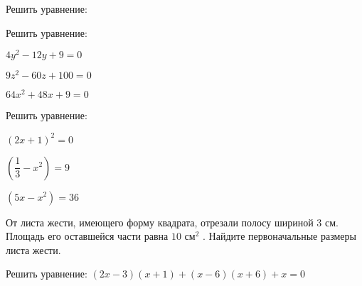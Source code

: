 %
%
\begin{homework}[number=1]
	\begin{listofex}
		\item Решить уравнение:
		\begin{enumcols}[itemcolumns=3]
			\item {}
			\item {}
			\item {}
			\item {}
			\item {}
			\item {}
		\end{enumcols}
		\item {}
		\item Решить уравнение:
			\begin{enumcols}[itemcolumns=3]
			\item \( 4y^2-12y+9=0 \)
			\item \( 9z^2-60z+100=0 \)
			\item \( 64x^2+48x+9=0 \)
		\end{enumcols}
		\item Решить уравнение:
			\begin{enumcols}[itemcolumns=3]
			\item \( (2x+1)^2=0 \)
			\item \( \left( \dfrac{1}{3}-x^2 \right)=9 \)
			\item \( (5x-x^2)=36 \)
		\end{enumcols}
	 \item От листа жести, имеющего форму квадрата, отрезали полосу шириной \( 3 \) см. Площадь его оставшейся части равна \( 10 \) см\( ^2 \) . Найдите первоначальные размеры листа жести.
	 \item Решить уравнение: \( (2x-3)(x+1)+(x-6)(x+6)+x=0 \)
	\end{listofex}
\end{homework}
%
%
